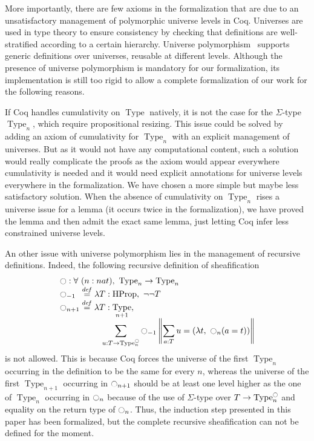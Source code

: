 \documentclass[conference]{IEEEtran}
\newcommand \defeq {\overset{de\hspace{-0.2ex}f}{=}}
\newcommand{\mynote}[2]{
    \fbox{\bfseries\sffamily\scriptsize#1}
    {\small$\blacktriangleright$\textsf{\emph{#2}}$\blacktriangleleft$}~}
\newcommand\nt[1]{\mynote{NT}{#1}}
\DeclareMathOperator{\Type}{Type}
\DeclareMathOperator{\HProp}{HProp}
\newcommand{\modal}{\ensuremath{\ocircle}}
\begin{document}
More importantly, there are few axioms in the formalization that are
due to an unsatisfactory management of polymorphic universe levels in
Coq.
%
Universes are used in type theory to ensure consistency by checking
that definitions are well-stratified according to a certain hierarchy.
%
Universe polymorphism~\cite{sozeau2014universe} supports generic
definitions over universes, reusable at different levels.
%
Although the presence of universe polymorphism is mandatory for our
formalization, its implementation is still too rigid to allow a
complete formalization of our work for the following reasons.

%
If Coq handles cumulativity on $\Type$ natively, it is not
the case for the $\Sigma$-type $\Type_n$, which require propositional
resizing. 
%
This issue could be solved by adding an axiom of cumulativity
for $\Type_n$ with an explicit management of universes. 
%
But as it would not have any computational content, such a solution
would really complicate the proofs as the axiom would appear
everywhere cumulativity is needed and it would need explicit
annotations for universe levels everywhere in the formalization.
%
We have chosen a more simple but maybe less satisfactory solution. 
%
When the absence of cumulativity on $\Type_n$ rises a universe issue
for a lemma (it occurs twice in the formalization), we have proved the
lemma and then admit the exact same lemma, just letting Coq infer less
constrained universe levels.

An other issue with universe polymorphism lies in the management of
recursive definitions. Indeed, the following recursive definition of
sheafification
%
\[ \begin{array}{l}
   \modal : \forall \ (n : nat), \ \Type_n \to \Type_n 
   \\
    \modal_{-1\phantom{n}} \defeq \lambda T:\HProp,~ \lnot\lnot T \\
      \displaystyle{\modal_{n+1} \defeq  \lambda T:\Type_{n+1}},\\
      \hspace{5em} \displaystyle{\sum_{u:T \to \Type_n^\modal} \modal_{-1} 
      \left\|
      \sum_{a:T} u= (\lambda t,~\modal_n (a=t))
      \right\|}
    \end{array}
\]
%
is not allowed. 
%
This is because Coq forces the universe of the first $\Type_n$
occurring in the definition to be the same for every $n$, whereas the
universe of the first $\Type_{n+1}$ occurring in $\modal_{n+1}$ should be at
least one level higher as the one of $\Type_n$ occurring in
$\modal_{n}$ because of the use of $\Sigma$-type over
$T \to \Type_n^\modal$ and equality on the return type of $\modal_n$.
%
%
Thus, the induction step presented in this paper has been formalized,
but the complete recursive sheafification can not be defined for the
moment.
\end{document}

